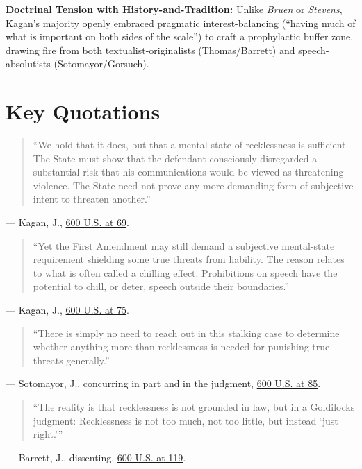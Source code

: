 \documentclass[12pt]{article}
\begin{document}
\textbf{Doctrinal Tension with History-and-Tradition:} Unlike \textit{Bruen} or \textit{Stevens}, Kagan's majority openly embraced pragmatic interest-balancing (``having much of what is important on both sides of the scale'') to craft a prophylactic buffer zone, drawing fire from both textualist-originalists (Thomas/Barrett) and speech-absolutists (Sotomayor/Gorsuch).

\section{Key Quotations}
\begin{quote}
``We hold that it does, but that a mental state of recklessness is sufficient. The State must show that the defendant consciously disregarded a substantial risk that his communications would be viewed as threatening violence. The State need not prove any more demanding form of subjective intent to threaten another.''
\end{quote}
\noindent --- Kagan, J., \href{https://www.supremecourt.gov/opinions/22pdf/600us1r51_g3bi.pdf}{600 U.S. at 69}.

\begin{quote}
``Yet the First Amendment may still demand a subjective mental-state requirement shielding some true threats from liability. The reason relates to what is often called a chilling effect. Prohibitions on speech have the potential to chill, or deter, speech outside their boundaries.''
\end{quote}
\noindent --- Kagan, J., \href{https://www.supremecourt.gov/opinions/22pdf/600us1r51_g3bi.pdf}{600 U.S. at 75}.

\begin{quote}
``There is simply no need to reach out in this stalking case to determine whether anything more than recklessness is needed for punishing true threats generally.''
\end{quote}
\noindent --- Sotomayor, J., concurring in part and in the judgment, \href{https://supreme.justia.com/cases/federal/us/600/22-138/}{600 U.S. at 85}.

\begin{quote}
``The reality is that recklessness is not grounded in law, but in a Goldilocks judgment: Recklessness is not too much, not too little, but instead `just right.'''
\end{quote}
\noindent --- Barrett, J., dissenting, \href{https://supreme.justia.com/cases/federal/us/600/22-138/}{600 U.S. at 119}.
\end{document}
